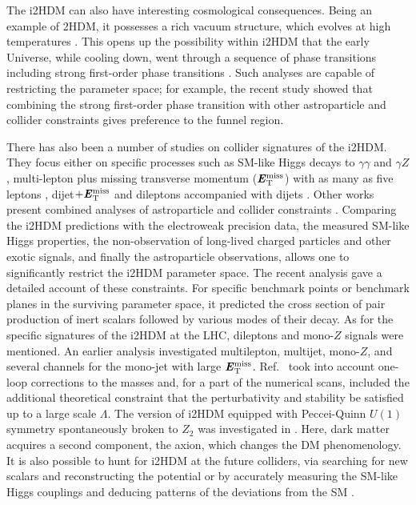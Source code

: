 \documentclass[12pt,a4paper]{article}
\newcommand{\MET}{\textbf{\textit{E}$_{\rm T}^{\rm miss}$}}
\begin{document}
The i2HDM can also have interesting cosmological consequences.
Being an example of 2HDM, it possesses a rich vacuum structure, which evolves at high temperatures 
\cite{Turok:1991uc,Cottingham:1995cj,Ginzburg:2009dp}.
This opens up the possibility within i2HDM that the early Universe, while cooling down, 
went through a sequence of phase transitions including strong first-order phase transitions 
\cite{Ginzburg:2010wa,Chowdhury:2011ga,Borah:2012pu,Gil:2012ya,Dorsch:2013wja,Cline:2013bln,Blinov:2015vma}.
Such analyses are capable of restricting the parameter space;
for example, the recent study \cite{Blinov:2015vma} showed that combining the strong 
first-order phase transition with other astroparticle and collider constraints gives preference to the funnel region.

There has also been a number of studies on collider signatures of the i2HDM. 
They focus either on specific processes such as SM-like Higgs decays to $\gamma\gamma$ and $\gamma Z$ 
\cite{Arhrib:2012ia,Swiezewska:2012eh,Krawczyk:2013jta,Krawczyk:2013pea},
multi-lepton plus missing transverse momentum ($\MET{}$) \cite{Miao:2010rg,Gustafsson:2012aj,Hashemi:2016wup}
with as many as five leptons \cite{Datta:2016nfz},
dijet$+\MET{}$ \cite{Poulose:2016lvz} and dileptons accompanied with dijets \cite{Hashemi:2016wup}.
Other works present combined analyses of astroparticle and collider constraints 
\cite{Goudelis:2013uca,Arhrib:2013ela,Ilnicka:2015jba,Alves:2016bib,Datta:2016nfz}.
Comparing the i2HDM predictions with the electroweak precision data, 
the measured SM-like Higgs properties, the non-observation
of long-lived charged particles and other exotic signals, and finally the astroparticle
observations, allows one to significantly restrict the i2HDM parameter space.
The recent analysis \cite{Ilnicka:2015jba} gave a detailed account of these constraints.
For specific benchmark points or benchmark planes in the surviving parameter space, 
it predicted the cross section of pair production of inert scalars followed by various modes of their decay.
As for the specific signatures of the i2HDM at the LHC, dileptons and mono-$Z$ signals were mentioned.
An earlier analysis \cite{Arhrib:2013ela} investigated multilepton, multijet, mono-$Z$,
and several channels for the mono-jet with large $\MET{}$.
Ref.~\cite{Goudelis:2013uca} took into account one-loop corrections to the masses
and, for a part of the numerical scans, included the additional theoretical constraint that 
the perturbativity and stability be satisfied up to a large scale $\Lambda$.
The version of i2HDM equipped with Peccei-Quinn $U(1)$ symmetry spontaneously broken to $Z_2$ 
was investigated in \cite{Alves:2016bib}. Here, dark matter acquires a second component, the axion, 
which changes the DM phenomenology.
It is also possible to hunt for i2HDM at the future colliders, via searching for new scalars
and reconstructing the potential \cite{Aoki:2013lhm} or by accurately measuring the SM-like Higgs couplings
and deducing patterns of the deviations from the SM \cite{Kanemura:2016sos}.
\end{document}
